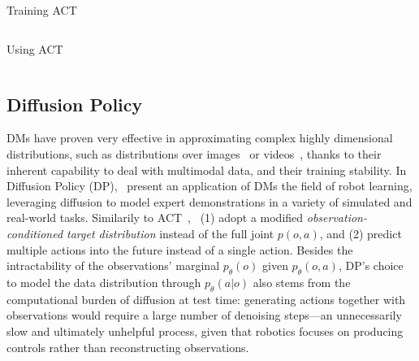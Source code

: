 \begin{pbox}[label={ex:act_training}]{Training ACT}
    \inputminted{python}{snippets/ch4/01_training_act.py}
\end{pbox}

\begin{pbox}[label={ex:act_using}]{Using ACT}
    \inputminted{python}{snippets/ch4/02_using_act.py}
\end{pbox}

\subsection{Diffusion Policy}
DMs have proven very effective in approximating complex highly dimensional distributions, such as distributions over images~\citep{hoDenoisingDiffusionProbabilistic2020} or videos~\citep{polyakMovieGenCast2025}, thanks to their inherent capability to deal with multimodal data, and their training stability.
In Diffusion Policy (DP),~\citet{chiDiffusionPolicyVisuomotor2024} present an application of DMs the field of robot learning, leveraging diffusion to model expert demonstrations in a variety of simulated and real-world tasks.
Similarily to ACT~\citep{zhaoLearningFineGrainedBimanual2023},~\citet{chiDiffusionPolicyVisuomotor2024} (1) adopt a modified \emph{observation-conditioned target distribution} instead of the full joint \( p(o,a) \), and (2) predict multiple actions into the future instead of a single action.
Besides the intractability of the observations' marginal \( p_\theta(o) \) given \(p_\theta(o,a) \), DP's choice to model the data distribution through \( p_\theta(a \vert o) \) also stems from the computational burden of diffusion at test time: generating actions together with observations would require a large number of denoising steps—an unnecessarily slow and ultimately unhelpful process, given that robotics focuses on producing controls rather than reconstructing observations.

